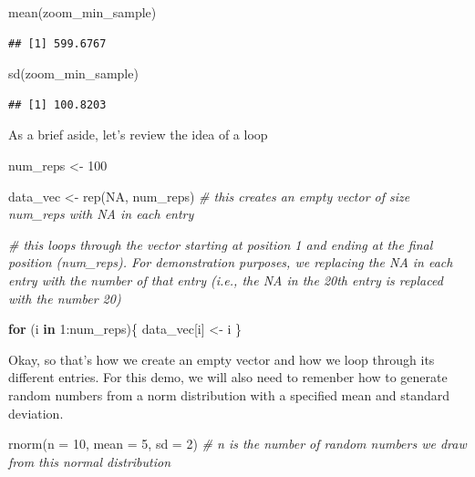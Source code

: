 \documentclass[
]{book}
\newenvironment{Shaded}{\begin{snugshade}}{\end{snugshade}}
\newcommand{\AttributeTok}[1]{\textcolor[rgb]{0.77,0.63,0.00}{#1}}
\newcommand{\CommentTok}[1]{\textcolor[rgb]{0.56,0.35,0.01}{\textit{#1}}}
\newcommand{\ConstantTok}[1]{\textcolor[rgb]{0.00,0.00,0.00}{#1}}
\newcommand{\ControlFlowTok}[1]{\textcolor[rgb]{0.13,0.29,0.53}{\textbf{#1}}}
\newcommand{\DecValTok}[1]{\textcolor[rgb]{0.00,0.00,0.81}{#1}}
\newcommand{\FunctionTok}[1]{\textcolor[rgb]{0.00,0.00,0.00}{#1}}
\newcommand{\NormalTok}[1]{#1}
\newcommand{\OtherTok}[1]{\textcolor[rgb]{0.56,0.35,0.01}{#1}}
\newcommand{\SpecialCharTok}[1]{\textcolor[rgb]{0.00,0.00,0.00}{#1}}
\begin{document}
\begin{Shaded}
\begin{Highlighting}[]
\FunctionTok{mean}\NormalTok{(zoom\_min\_sample)}
\end{Highlighting}
\end{Shaded}

\begin{verbatim}
## [1] 599.6767
\end{verbatim}

\begin{Shaded}
\begin{Highlighting}[]
\FunctionTok{sd}\NormalTok{(zoom\_min\_sample)}
\end{Highlighting}
\end{Shaded}

\begin{verbatim}
## [1] 100.8203
\end{verbatim}

As a brief aside, let's review the idea of a loop

\begin{Shaded}
\begin{Highlighting}[]
\NormalTok{num\_reps }\OtherTok{\textless{}{-}} \DecValTok{100}

\NormalTok{data\_vec }\OtherTok{\textless{}{-}} \FunctionTok{rep}\NormalTok{(}\ConstantTok{NA}\NormalTok{, num\_reps) }\CommentTok{\# this creates an empty vector of size num\_reps with NA in each entry}

\CommentTok{\# this loops through the vector starting at position 1 and ending at the final position (num\_reps). For demonstration purposes, we replacing the NA in each entry with the number of that entry (i.e., the NA in the 20th entry is replaced with the number 20)}

\ControlFlowTok{for}\NormalTok{ (i }\ControlFlowTok{in} \DecValTok{1}\SpecialCharTok{:}\NormalTok{num\_reps)\{}
\NormalTok{  data\_vec[i] }\OtherTok{\textless{}{-}}\NormalTok{ i}
\NormalTok{\}}
\end{Highlighting}
\end{Shaded}

Okay, so that's how we create an empty vector and how we loop through its different entries. For this demo, we will also need to remenber how to generate random numbers from a norm distribution with a specified mean and standard deviation.

\begin{Shaded}
\begin{Highlighting}[]
\FunctionTok{rnorm}\NormalTok{(}\AttributeTok{n =} \DecValTok{10}\NormalTok{, }\AttributeTok{mean =} \DecValTok{5}\NormalTok{, }\AttributeTok{sd =} \DecValTok{2}\NormalTok{) }\CommentTok{\# n is the number of random numbers we draw from this normal distribution}
\end{Highlighting}
\end{Shaded}
\end{document}
